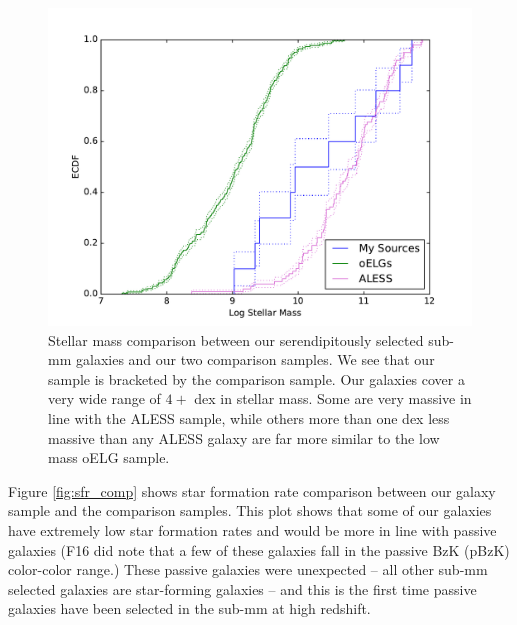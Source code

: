 \documentclass[preprint,natbib209]{aastex}
\begin{document}
\begin{figure}[t]
\centering
\includegraphics[scale=0.8]{ecdf_mass.pdf}
\caption{Stellar mass comparison between our serendipitously selected sub-mm galaxies and our two comparison samples. We see that our sample is bracketed by the comparison sample. Our galaxies cover a very wide range of $4+$ dex in stellar mass. Some are very massive in line with the ALESS sample, while others more than one dex less massive than any ALESS galaxy are far more similar to the low mass oELG sample.}
\label{fig:mass_comp}
\end{figure}

Figure \ref{fig:sfr_comp} shows star formation rate comparison between our galaxy sample and the comparison samples. This plot shows that some of our galaxies have extremely low star formation rates and would be more in line with passive galaxies (F16 did note that a few of these galaxies fall in the passive BzK (pBzK) color-color range.) These passive galaxies were unexpected -- all other sub-mm selected galaxies are star-forming galaxies -- and this is the first time passive galaxies have been selected in the sub-mm at high redshift. 
\end{document}
